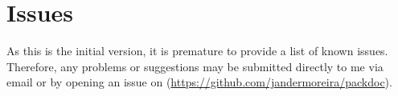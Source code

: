 \documentclass[11pt]{article}
\begin{document}
\begin{PDListing}
\end{PDListing}


\section{Issues}

As this is the initial version, it is premature to provide a list of known issues. Therefore, any problems or suggestions may be submitted directly to me via email or by opening an issue on  (\url{https://github.com/jandermoreira/packdoc}).

\printindex
\end{document}
